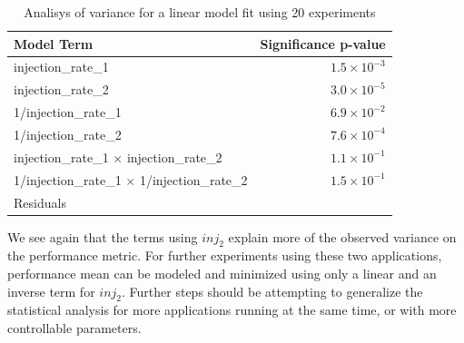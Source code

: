 \documentclass[a4paper]{article}
\begin{document}
\begin{table}[ht]
\centering
\caption{Analisys of variance for a linear model fit using 20 experiments}
\begin{tabular}{lr}
  \toprule
Model Term & Significance p-value \\
  \midrule
injection\_rate\_1 & $1.5 \times 10^{-3}$ \\
  injection\_rate\_2 & $3.0 \times 10^{-5}$ \\
  1/injection\_rate\_1 & $6.9 \times 10^{-2}$ \\
  1/injection\_rate\_2 & $7.6 \times 10^{-4}$ \\
  injection\_rate\_1 $\times$ injection\_rate\_2 & $1.1 \times 10^{-1}$ \\
  1/injection\_rate\_1 $\times$ 1/injection\_rate\_2 & $1.5 \times 10^{-1}$ \\
  Residuals &  \\
   \bottomrule
\end{tabular}
\end{table}

We see again that  the terms using \(inj_2\) explain more  of the observed variance
on the performance metric. For further experiments using these two applications,
performance mean can be modeled and minimized using only a linear and an inverse
term  for  \(inj_2\).  Further  steps   should  be  attempting  to  generalize  the
statistical analysis  for more applications  running at  the same time,  or with
more controllable parameters.
\end{document}
